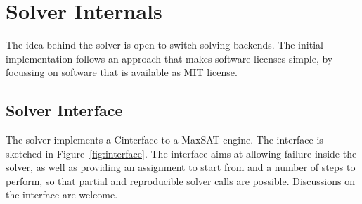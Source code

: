 \documentclass[conference]{IEEEtran}
\def\CC{{C\nolinebreak[4]\hspace{-.05em}\raisebox{.4ex}{\tiny\bf ++}}}
\begin{document}
\section{Solver Internals}

The idea behind the solver is open to switch solving backends.
The initial implementation follows an approach that makes software licenses simple, by focussing on software that is available as MIT license.

\subsection{Solver Interface}

The solver implements a \CC interface to a MaxSAT engine.
The interface is sketched in Figure~\ref{fig:interface}.
The interface aims at allowing failure inside the solver, as well as providing an assignment to start from and a number of steps to perform, so that partial and reproducible solver calls are possible.
Discussions on the interface are welcome.
\end{document}
